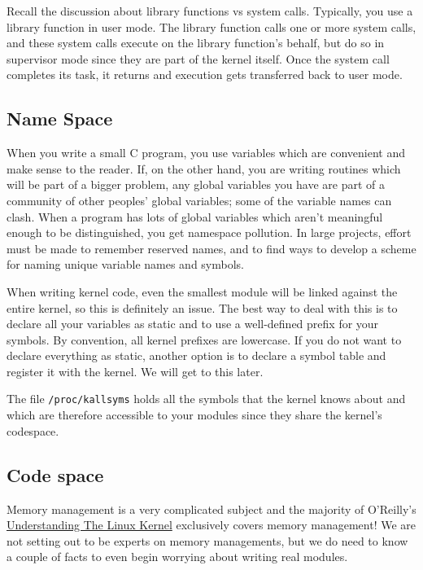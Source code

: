 \documentclass[10pt, oneside]{book}
\begin{document}
Recall the discussion about library functions vs system calls.
Typically, you use a library function in user mode.
The library function calls one or more system calls, and these system calls execute on the library function's behalf, but do so in supervisor mode since they are part of the kernel itself.
Once the system call completes its task, it returns and execution gets transferred back to user mode.

\subsection{Name Space}
\label{sec:namespace}
When you write a small C program, you use variables which are convenient and make sense to the reader.
If, on the other hand, you are writing routines which will be part of a bigger problem, any global variables you have are part of a community of other peoples' global variables; some of the variable names can clash.
When a program has lots of global variables which aren't meaningful enough to be distinguished, you get namespace pollution.
In large projects, effort must be made to remember reserved names, and to find ways to develop a scheme for naming unique variable names and symbols.

When writing kernel code, even the smallest module will be linked against the entire kernel, so this is definitely an issue.
The best way to deal with this is to declare all your variables as static and to use a well-defined prefix for your symbols.
By convention, all kernel prefixes are lowercase. If you do not want to declare everything as static, another option is to declare a symbol table and register it with the kernel.
We will get to this later.

The file \verb|/proc/kallsyms| holds all the symbols that the kernel knows about and which are therefore accessible to your modules since they share the kernel's codespace.

\subsection{Code space}
\label{sec:codespace}
Memory management is a very complicated subject and the majority of O'Reilly's \href{https://www.oreilly.com/library/view/understanding-the-linux/0596005652/}{Understanding The Linux Kernel} exclusively covers memory management!
We are not setting out to be experts on memory managements, but we do need to know a couple of facts to even begin worrying about writing real modules.
\end{document}
